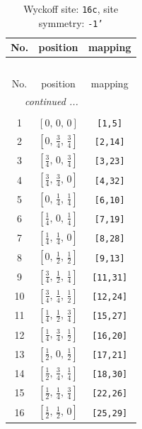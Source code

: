 \documentclass[fleqn,8pt]{jsarticle}
\begin{document}
\begin{longtable}{ccc}
\caption{Wyckoff site: {\tt 16c}, site symmetry: {\tt -1'}}
 \\
 \hline \hline
No. & position & mapping \\ \hline \endfirsthead

\multicolumn{2}{l}{\tablename\ \thetable{}} \\
 \hline \hline
No. & position & mapping \\ \hline \endhead

 \hline \hline
\multicolumn{2}{r}{\footnotesize\it continued ...} \\ \endfoot

 \hline \hline
\multicolumn{2}{r}{} \\ \endlastfoot

1 & $\left[ 0,\, 0,\, 0 \right]$ & {\tt [1,5]} \\ \hline
2 & $\left[ 0,\, \frac{3}{4},\, \frac{3}{4} \right]$ & {\tt [2,14]} \\ \hline
3 & $\left[ \frac{3}{4},\, 0,\, \frac{3}{4} \right]$ & {\tt [3,23]} \\ \hline
4 & $\left[ \frac{3}{4},\, \frac{3}{4},\, 0 \right]$ & {\tt [4,32]} \\ \hline
5 & $\left[ 0,\, \frac{1}{4},\, \frac{1}{4} \right]$ & {\tt [6,10]} \\ \hline
6 & $\left[ \frac{1}{4},\, 0,\, \frac{1}{4} \right]$ & {\tt [7,19]} \\ \hline
7 & $\left[ \frac{1}{4},\, \frac{1}{4},\, 0 \right]$ & {\tt [8,28]} \\ \hline
8 & $\left[ 0,\, \frac{1}{2},\, \frac{1}{2} \right]$ & {\tt [9,13]} \\ \hline
9 & $\left[ \frac{3}{4},\, \frac{1}{2},\, \frac{1}{4} \right]$ & {\tt [11,31]} \\ \hline
10 & $\left[ \frac{3}{4},\, \frac{1}{4},\, \frac{1}{2} \right]$ & {\tt [12,24]} \\ \hline
11 & $\left[ \frac{1}{4},\, \frac{1}{2},\, \frac{3}{4} \right]$ & {\tt [15,27]} \\ \hline
12 & $\left[ \frac{1}{4},\, \frac{3}{4},\, \frac{1}{2} \right]$ & {\tt [16,20]} \\ \hline
13 & $\left[ \frac{1}{2},\, 0,\, \frac{1}{2} \right]$ & {\tt [17,21]} \\ \hline
14 & $\left[ \frac{1}{2},\, \frac{3}{4},\, \frac{1}{4} \right]$ & {\tt [18,30]} \\ \hline
15 & $\left[ \frac{1}{2},\, \frac{1}{4},\, \frac{3}{4} \right]$ & {\tt [22,26]} \\ \hline
16 & $\left[ \frac{1}{2},\, \frac{1}{2},\, 0 \right]$ & {\tt [25,29]} \\
\end{longtable}
\end{document}

